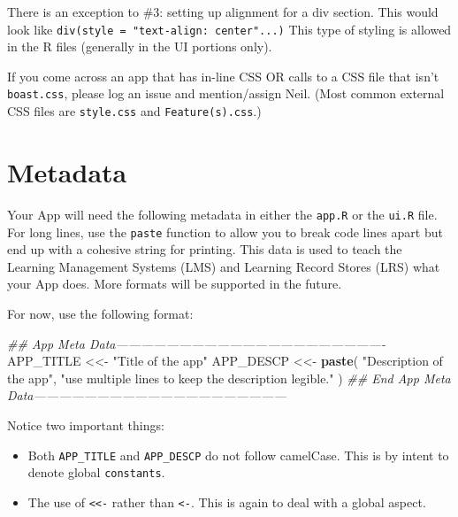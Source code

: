 \documentclass[
]{book}
\newenvironment{Shaded}{\begin{snugshade}}{\end{snugshade}}
\newcommand{\CommentTok}[1]{\textcolor[rgb]{0.56,0.35,0.01}{\textit{#1}}}
\newcommand{\KeywordTok}[1]{\textcolor[rgb]{0.13,0.29,0.53}{\textbf{#1}}}
\newcommand{\NormalTok}[1]{#1}
\newcommand{\StringTok}[1]{\textcolor[rgb]{0.31,0.60,0.02}{#1}}
\providecommand{\tightlist}{%
  \setlength{\itemsep}{0pt}\setlength{\parskip}{0pt}}
\begin{document}
There is an exception to \#3: setting up alignment for a div section. This would look like \texttt{div(style\ =\ "text-align:\ center"...)} This type of styling is allowed in the R files (generally in the UI portions only).

If you come across an app that has in-line CSS OR calls to a CSS file that isn't \texttt{boast.css}, please log an issue and mention/assign Neil. (Most common external CSS files are \texttt{style.css} and \texttt{Feature(s).css}.)

\hypertarget{metadata}{%
\section{Metadata}\label{metadata}}

Your App will need the following metadata in either the \texttt{app.R} or the \texttt{ui.R} file. For long lines, use the \texttt{paste} function to allow you to break code lines apart but end up with a cohesive string for printing. This data is used to teach the Learning Management Systems (LMS) and Learning Record Stores (LRS) what your App does. More formats will be supported in the future.

For now, use the following format:

\begin{Shaded}
\begin{Highlighting}[]
\CommentTok{## App Meta Data----------------------------------------------------------------}
\NormalTok{APP_TITLE  <<-}\StringTok{ "Title of the app"}
\NormalTok{APP_DESCP  <<-}\StringTok{ }\KeywordTok{paste}\NormalTok{(}
  \StringTok{"Description of the app"}\NormalTok{,}
  \StringTok{"use multiple lines to keep the description legible."}
\NormalTok{)}
\CommentTok{## End App Meta Data------------------------------------------------------------}
\end{Highlighting}
\end{Shaded}

Notice two important things:

\begin{itemize}
\tightlist
\item
  Both \texttt{APP\_TITLE} and \texttt{APP\_DESCP} do not follow camelCase. This is by intent to denote global \texttt{constants}.
\item
  The use of \texttt{\textless{}\textless{}-} rather than \texttt{\textless{}-}. This is again to deal with a global aspect.
\end{itemize}
\end{document}
